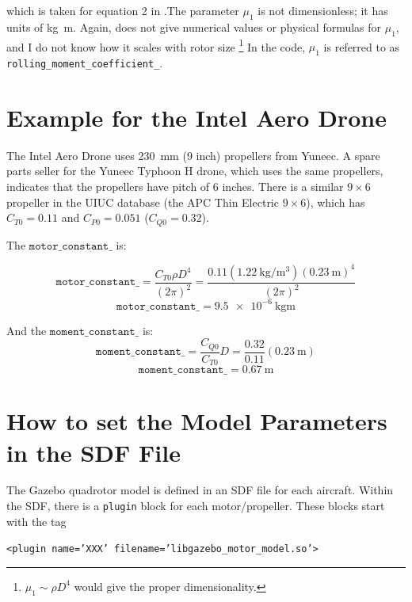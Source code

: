 \documentclass[12pt]{article}
\begin{document}
which is taken for equation 2 in \cite{martin:hal-00422423}.The parameter $\mu_1$ is not dimensionless; it has units of \si{\kilogram \meter}. Again, \cite{martin:hal-00422423} does not give numerical values or physical formulas for $\mu_1$, and I do not know how it scales with rotor size \footnote{$\mu_1 \sim \rho D^4$ would give the proper dimensionality.}
In the code, $\mu_1$ is referred to as \texttt{rolling\_moment\_coefficient\_}.


\section{Example for the Intel Aero Drone}  \label{sec:example}
The Intel Aero Drone uses \SI{230}{\milli\meter} (9 inch) propellers from Yuneec. A spare parts seller for the Yuneec Typhoon H drone, which uses the same propellers, indicates that the propellers have pitch of 6 inches. There is a similar $9 \times 6$ propeller in the UIUC database (the APC Thin Electric $9 \times 6$), which has $C_{T0} = 0.11$ and $C_{P0} = 0.051$ ($C_{Q0} = 0.32$).

The $\mathtt{motor\_constant\_}$ is:

\begin{equation}
\mathtt{motor\_constant\_} = \frac{C_{T0} \rho D^4}{(2 \pi)^2} = \frac{0.11 (\SI{1.22}{\kilogram\per\meter\cubed}) (\SI{0.23}{\meter})^4}{(2 \pi)^2}
\end{equation}
\begin{equation}
\mathtt{motor\_constant\_} = \SI{9.5e-6}{\kilogram\meter}
\end{equation}

And the $\mathtt{moment\_constant\_}$ is:
\begin{equation}
\mathtt{moment\_constant\_} = \frac{C_{Q0}}{C_{T0}} D = \frac{0.32}{0.11} (\SI{0.23}{\meter})
\end{equation}
\begin{equation}
\mathtt{moment\_constant\_} = \SI{0.67}{\meter}
\end{equation}


\section{How to set the Model Parameters in the SDF File} \label{sec:sdf}
The Gazebo quadrotor model is defined in an SDF file for each aircraft. Within the SDF, there is a \texttt{plugin} block for each motor/propeller. These blocks start with the tag

\texttt{<plugin name='XXX' filename='libgazebo\_motor\_model.so'>}
\end{document}
